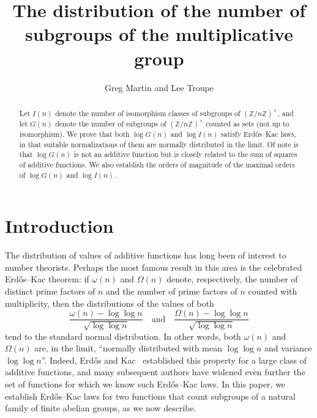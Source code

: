 \documentclass[12pt,reqno]{amsart}
\theoremstyle{definition}
\newcommand{\Z}{{\mathbb Z}}
\begin{document}
\title{The distribution of the number of subgroups of the multiplicative group}
\author[Greg Martin and Lee Troupe]{Greg Martin and Lee Troupe}
\address{Department of Mathematics \\ University of British Columbia \\ Room 121, 1984 Mathematics Road \\ Canada V6T 1Z2}
\maketitle


\begin{abstract}
Let $I(n)$ denote the number of isomorphism classes of subgroups of $(\Z/n\Z)^\times$, and let $G(n)$ denote the number of subgroups of $(\Z/n\Z)^\times$ counted as sets (not up to isomorphism). We prove that both $\log G(n)$ and $\log I(n)$ satisfy Erd{\H o}s--Kac laws, in that suitable normalizations of them are normally distributed in the limit. Of note is that $\log G(n)$ is not an additive function but is closely related to the sum of squares of additive functions. We also establish the orders of magnitude of the maximal orders of $\log G(n)$ and $\log I(n)$.
\end{abstract}

\section{Introduction}

The distribution of values of additive functions has long been of interest to number theorists. Perhaps the most famous result in this area is the celebrated Erd{\H o}s--Kac theorem: if $\omega(n)$ and $\Omega(n)$ denote, respectively, the number of distinct prime factors of $n$ and the number of prime factors of $n$ counted with multiplicity, then the distributions of the values of both
\[
\frac{\omega(n) - \log\log n}{\sqrt{\log\log n}} \quad\text{and}\quad \frac{\Omega(n) - \log\log n}{\sqrt{\log\log n}}
\]
tend to the standard normal distribution. In other words, both $\omega(n)$ and $\Omega(n)$ are, in the limit, ``normally distributed with mean $\log\log n$ and variance $\log\log n$''. Indeed, Erd{\H o}s and Kac~\cite{ek40} established this property for a large class of additive functions, and many subsequent authors have widened even further the set of functions for which we know such Erd{\H o}s--Kac laws. In this paper, we establish Erd{\H o}s--Kac laws for two functions that count subgroups of a natural family of finite abelian groups, as we now describe.
\end{document}
